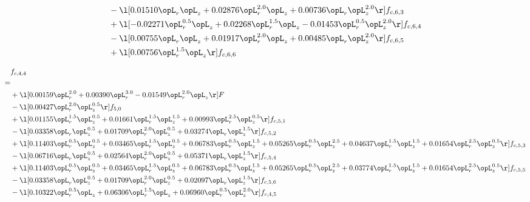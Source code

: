 \begin{alignat}{2}
& - \l[  0.01510 \opL_r \opL_z +  0.02876 \opL_r^{2.0} \opL_z +  0.00736 \opL_r \opL_z^{2.0}  \r] f_{c,6,3} \nonumber \\ 
& + \l[  -0.02271 \opL_r^{0.5} \opL_z +  0.02268 \opL_r^{1.5} \opL_z   -0.01453 \opL_r^{0.5} \opL_z^{2.0}  \r] f_{c,6,4} \nonumber \\ 
& - \l[  0.00755 \opL_r \opL_z +  0.01917 \opL_r^{2.0} \opL_z +  0.00485 \opL_r \opL_z^{2.0}  \r] f_{c,6,5} \nonumber \\ 
& + \l[  0.00756 \opL_r^{1.5} \opL_z  \r] f_{c,6,6} \nonumber \\ 
\end{alignat} 


\begin{alignat}{2} 
\label{eq:f_44_2} 
& f_{c,4,4} \nonumber \\ 
 = \\ 
& + \l[  0.00159 \opL_r^{2.0} +  0.00390 \opL_r^{3.0}   -0.01549 \opL_r^{2.0} \opL_z  \r] F \nonumber \\ 
& - \l[  0.00427 \opL_r^{2.0} \opL_z^{0.5}  \r] f_{5,0} \nonumber \\ 
& + \l[  0.01155 \opL_r^{1.5} \opL_z^{0.5} +  0.01661 \opL_r^{1.5} \opL_z^{1.5} +  0.00993 \opL_r^{2.5} \opL_z^{0.5}  \r] f_{c,5,1} \nonumber \\ 
& - \l[  0.03358 \opL_r \opL_z^{0.5} +  0.01709 \opL_r^{2.0} \opL_z^{0.5} +  0.03274 \opL_r \opL_z^{1.5}  \r] f_{c,5,2} \nonumber \\ 
& + \l[  0.11403 \opL_r^{0.5} \opL_z^{0.5} +  0.03465 \opL_r^{1.5} \opL_z^{0.5} +  0.06783 \opL_r^{0.5} \opL_z^{1.5} +  0.05265 \opL_r^{0.5} \opL_z^{2.5} +  0.04637 \opL_r^{1.5} \opL_z^{1.5} +  0.01654 \opL_r^{2.5} \opL_z^{0.5}  \r] f_{c,5,3} \nonumber \\ 
& - \l[  0.06716 \opL_r \opL_z^{0.5} +  0.02564 \opL_r^{2.0} \opL_z^{0.5} +  0.05371 \opL_r \opL_z^{1.5}  \r] f_{c,5,4} \nonumber \\ 
& + \l[  0.11403 \opL_r^{0.5} \opL_z^{0.5} +  0.03465 \opL_r^{1.5} \opL_z^{0.5} +  0.06783 \opL_r^{0.5} \opL_z^{1.5} +  0.05265 \opL_r^{0.5} \opL_z^{2.5} +  0.03774 \opL_r^{1.5} \opL_z^{1.5} +  0.01654 \opL_r^{2.5} \opL_z^{0.5}  \r] f_{c,5,5} \nonumber \\ 
& - \l[  0.03358 \opL_r \opL_z^{0.5} +  0.01709 \opL_r^{2.0} \opL_z^{0.5} +  0.02097 \opL_r \opL_z^{1.5}  \r] f_{c,5,6} \nonumber \\ 
& - \l[  0.10322 \opL_r^{0.5} \opL_z +  0.06306 \opL_r^{1.5} \opL_z +  0.06960 \opL_r^{0.5} \opL_z^{2.0}  \r] f_{c,4,5} \nonumber \\ 

\end{alignat}
